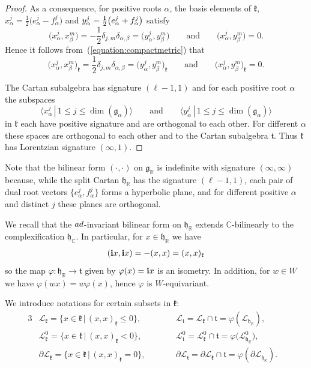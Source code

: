 \documentclass[11pt]{article}
\numberwithin{equation}{section}
\numberwithin{equation}{section}
\def\C{{\mathbb C}}
\def\R{\mathbb{R}}
\def\la{\langle}
\def\ra{\rangle}
\def\bi{{\bf i}}
\def\cL{\mathcal L}
\def\g{\mathfrak{g}}
\def\h{\mathfrak{h}}
\def\k{\mathfrak{k}}
\def\ft{\mathfrak{t}}
\begin{document}
\begin{proof}
As a consequence, for positive roots $\alpha$, the basis elements of $\k$, $x_{\alpha}^j = \frac{1}{2}\big(e_{\alpha}^j-f_{\alpha}^j\big)$ and
$y_{\alpha}^j=\frac{{\bi}}{2}\big(e_{\alpha}^j+f_{\alpha}^j\big)$ satisfy
\[\big(x_{\alpha}^j, x_{\beta}^m\big) = -\frac{1}{2}\delta_{j,m}\delta_{\alpha, \beta} = \big(y_{\alpha}^j,y_{\beta}^m\big) \qquad \text{and} \qquad
\big(x_{\alpha}^j, y_{\beta}^m\big) = 0.\]
Hence it follows from~(\ref{equation:compactmetric}) that
\[\big(x_{\alpha}^j, x_{\beta}^m\big)_\k = \frac{1}{2}\delta_{j,m}\delta_{\alpha, \beta} = \big(y_{\alpha}^j,y_{\beta}^m\big)_\k \qquad \text{and} \qquad
\big(x_{\alpha}^j, y_{\beta}^m\big)_\k = 0.\]

The Cartan subalgebra has signature $(\ell-1,1)$ and for each positive root $\alpha$ the subspaces
\[\big\la x_{\alpha}^{j}\, |\, 1\leq j\leq \dim (\g_{\alpha})\big\ra \qquad \text{and} \qquad
 \big\la y_{\alpha}^{j} \, |\, 1\leq j\leq \dim (\g_{\alpha}) \big\ra\]
in $\k$ each have positive signature and are orthogonal to each other. For different $\alpha$ these spaces are orthogonal to each other and to the Cartan subalgebra $\ft$. Thus $\k$ has Lorentzian signature $(\infty,1)$.
\end{proof}

\begin{Remark} Note that the bilinear form $(\cdot,\cdot)$ on $\g_\R$ is indefinite with signature $(\infty,\infty)$ because, while the split Cartan $\h_{\R}$ has the signature $(\ell-1,1)$, each pair of dual root vectors $\big\{e_{\alpha}^{j}, f_{\alpha}^{j}\big\}$ forms a hyperbolic plane, and for different positive $\alpha$ and distinct $j$ these planes are orthogonal.
\end{Remark}

We recall that the ${\rm ad}$-invariant bilinear form on $\h_{\R}$ extends $\C$-bilinearly to the complexification $\h_{\C}$. In particular, for $x\in\h_{\R}$ we have
\begin{gather*}%
({\bi}x,{\bi}x)=-(x,x)=(x,x)_{\k}
\end{gather*}
so the map $\varphi\colon \h_\R \longrightarrow \ft$ given by $\varphi(x) = {\bi}x$ is an isometry. In addition, for $w\in W$ we have $\varphi(wx)=w\varphi(x)$, hence $\varphi$ is $W$-equivariant.

We introduce notations for certain subsets in $\k$:
\begin{alignat*}{3}
& \cL_{\k}=\{x\in \k\,|\, (x,x)_{\k}\leq 0\},\qquad && \cL_{\ft} = \cL_{\k}\cap \ft = \varphi(\cL_{\h_\R}),&\\
& \cL_{\k}^0=\{x\in \k\,|\, (x,x)_{\k}< 0\}, \qquad && \cL_{\ft}^0 = \cL_{\k}^0\cap \ft = \varphi\big(\cL_{\h_\R}^0\big),& \\
& \partial\cL_{\k}=\{x\in \k\,|\, (x,x)_{\k}= 0\}, \qquad && \partial\cL_{\ft} = \partial\cL_{\k}\cap \ft = \varphi(\partial\cL_{\h_\R}).&
\end{alignat*}
\end{document}
